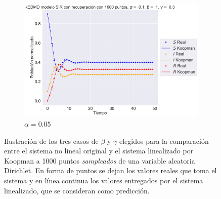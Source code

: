 \begin{figure}[h]
\begin{subfigure}[b]{0.45\textwidth}
        \label{fig:image2}
    \end{subfigure}
    \hfill
    \begin{subfigure}[b]{0.45\textwidth}
        \centering
        \includegraphics[width=\textwidth]{img/content/chapter3/SIR_rec3.pdf}
        \caption{$\alpha=0.05$}
    \end{subfigure}
    \caption{Ilustración de los tres casos de $\beta$ y $\gamma$ elegidos para la comparación entre el sistema no lineal original y el sistema linealizado por Koopman a 1000 puntos \textit{sampleados} de una variable aleatoria Dirichlet. En forma de puntos se dejan los valores reales que toma el sistema y en línea continua los valores entregados por el sistema linealizado, que se consideran como predicción.}
    \label{fig:Comp_traj_SIR}
\end{figure}
